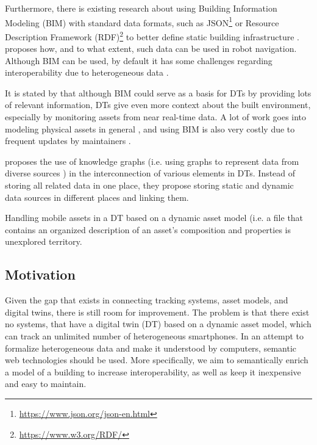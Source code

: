 \documentclass{article}
\begin{document}
Furthermore, there is existing research about using Building Information Modeling (BIM) with standard data formats, such as JSON\footnote{\url{https://www.json.org/json-en.html}} or Resource Description Framework (RDF)\footnote{\url{https://www.w3.org/RDF/}} to better define static building infrastructure \cite{pauwels_live_2023}. \citeauthor{pauwels_live_2023} proposes how, and to what extent, such data can be used in robot navigation. Although BIM can be used, by default it has some challenges regarding interoperability due to heterogeneous data \cite{dinis_bim_2022,godager_concept_2021}. 

It is stated by \citeauthor{godager_concept_2021} that although BIM could serve as a basis for DTs by providing lots of relevant information, DTs give even more context about the built environment, especially by monitoring assets from near real-time data. A lot of work goes into modeling physical assets in general \cite{waszak_let_2022}, and using BIM is also very costly due to frequent updates by maintainers \cite{hamledari_ifc-based_2018}.

\citeauthor{waszak_let_2022} proposes the use of knowledge graphs (i.e. using graphs to represent data from diverse sources \cite{hogan_introduction_2022, ryen_building_2022}) in the interconnection of various elements in DTs. Instead of storing all related data in one place, they propose storing static and dynamic data sources in different places and linking them.

Handling mobile assets in a DT based on a dynamic asset model (i.e. a file that contains an organized description of an asset's composition and properties \cite{kamburjan_twinning-by-construction_2022} is unexplored territory.


\subsection{Motivation}
Given the gap that exists in connecting tracking systems, asset models, and digital twins, there is still room for improvement. The problem is that there exist no systems, that have a digital twin (DT) based on a dynamic asset model, which can track an unlimited number of heterogeneous smartphones. In an attempt to formalize heterogeneous data and make it understood by computers, semantic web technologies should be used. More specifically, we aim to semantically enrich a model of a building to increase interoperability, as well as keep it inexpensive and easy to maintain.
\end{document}
